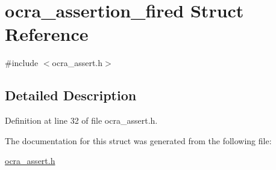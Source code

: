 \hypertarget{structocra__assertion__fired}{}\section{ocra\+\_\+assertion\+\_\+fired Struct Reference}
\label{structocra__assertion__fired}


{\ttfamily \#include $<$ocra\+\_\+assert.\+h$>$}



\subsection{Detailed Description}


Definition at line 32 of file ocra\+\_\+assert.\+h.



The documentation for this struct was generated from the following file\+:\begin{DoxyCompactItemize}
\item 
\hyperlink{ocra__assert_8h}{ocra\+\_\+assert.\+h}\end{DoxyCompactItemize}
